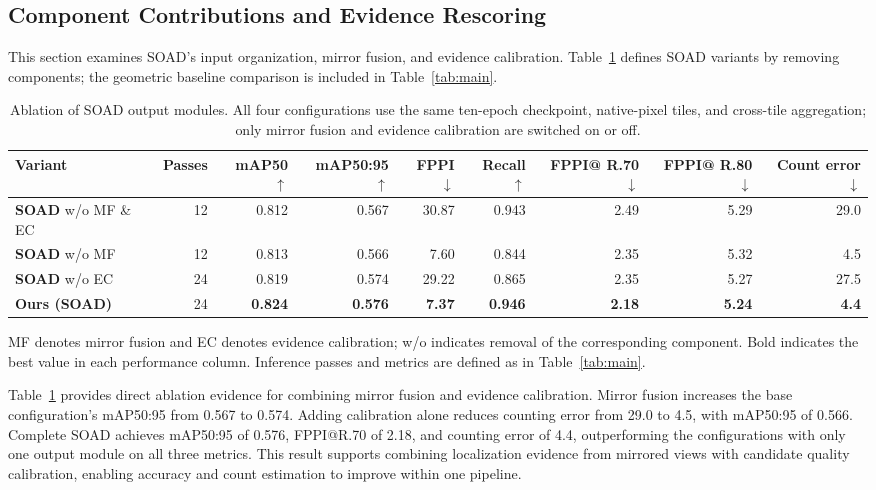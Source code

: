 \documentclass[11pt,a4paper]{article}
\begin{document}
\subsection{Component Contributions and Evidence Rescoring}
This section examines SOAD's input organization, mirror fusion, and evidence calibration. Table~\ref{tab:configs} defines SOAD variants by removing components; the geometric baseline comparison is included in Table~\ref{tab:main}.

\begin{table}[H]
\centering
\scriptsize\setlength{\tabcolsep}{4pt}
\caption{Ablation of SOAD output modules. All four configurations use the same ten-epoch checkpoint, native-pixel tiles, and cross-tile aggregation; only mirror fusion and evidence calibration are switched on or off.}
\label{tab:configs}
\begin{adjustbox}{max width=\linewidth}
\begin{tabular}{lrrrrrrrr}
\toprule
Variant & Passes & mAP50$\uparrow$ & mAP50:95$\uparrow$ & FPPI$\downarrow$ & Recall$\uparrow$ & \shortstack{FPPI@\\R.70$\downarrow$} & \shortstack{FPPI@\\R.80$\downarrow$} & \shortstack{Count\\error$\downarrow$} \\
\midrule
\textbf{SOAD} w/o MF \& EC & 12 & 0.812 & 0.567 & 30.87 & 0.943 & 2.49 & 5.29 & 29.0 \\
\textbf{SOAD} w/o MF & 12 & 0.813 & 0.566 & 7.60 & 0.844 & 2.35 & 5.32 & 4.5 \\
\textbf{SOAD} w/o EC & 24 & 0.819 & 0.574 & 29.22 & 0.865 & 2.35 & 5.27 & 27.5 \\
\midrule
\textbf{Ours (SOAD)} & 24 & \textbf{0.824} & \textbf{0.576} & \textbf{7.37} & \textbf{0.946} & \textbf{2.18} & \textbf{5.24} & \textbf{4.4} \\
\bottomrule
\end{tabular}
\end{adjustbox}
\par\vspace{2pt}\parbox{0.97\linewidth}{\footnotesize MF denotes mirror fusion and EC denotes evidence calibration; w/o indicates removal of the corresponding component. Bold indicates the best value in each performance column. Inference passes and metrics are defined as in Table~\ref{tab:main}.}
\end{table}
Table~\ref{tab:configs} provides direct ablation evidence for combining mirror fusion and evidence calibration. Mirror fusion increases the base configuration's mAP50:95 from 0.567 to 0.574. Adding calibration alone reduces counting error from 29.0 to 4.5, with mAP50:95 of 0.566. Complete SOAD achieves mAP50:95 of 0.576, FPPI@R.70 of 2.18, and counting error of 4.4, outperforming the configurations with only one output module on all three metrics. This result supports combining localization evidence from mirrored views with candidate quality calibration, enabling accuracy and count estimation to improve within one pipeline.
\end{document}
